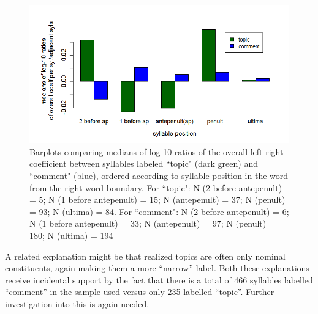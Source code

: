 \documentclass[output=paper]{LSP/langsci}
\begin{document}
\begin{figure}
\includegraphics[width=\textwidth]{figures/BUC-img7_new.png}
\caption{Barplots comparing medians of log-10 ratios of the overall left-right coefficient between syllables labeled “topic" (dark green) and “comment" (blue), ordered according to syllable position in the word from the right word boundary. For “topic": N (2 before antepenult) = 5; N (1 before antepenult) = 15; N (antepenult) = 37; N (penult) = 93; N (ultima) = 84. For “comment": N (2 before antepenult) = 6; N (1 before antepenult) = 33; N (antepenult) = 97; N (penult) = 180; N (ultima) = 194
}
\label{fig:buc:7}
\end{figure}





A related explanation might be that realized topics are often only nominal constituents, again making them a more “narrow” label. Both these explanations receive incidental support by the fact that there is a total of 466 syllables labelled “comment” in the sample used versus only 235 labelled “topic”. Further investigation into this is again needed.
\\
\end{document}
